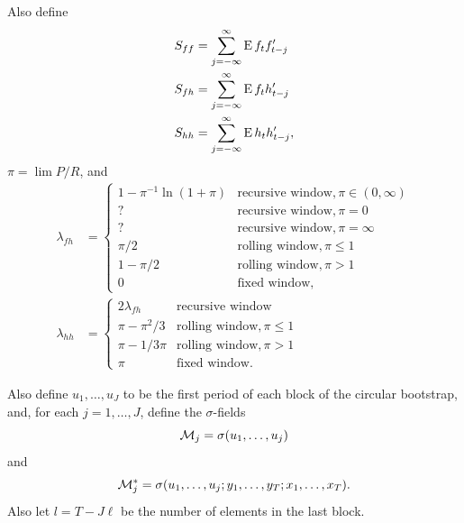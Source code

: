 \documentclass[12pt,fleqn]{article}
\begin{document}
Also define
\begin{align*}
  S_{ff} &= \sum_{j=-\infty}^\infty \operatorname{E} f_t f_{t-j}' \\
  S_{fh} &= \sum_{j=-\infty}^\infty \operatorname{E} f_t h_{t-j}' \\
  S_{hh} &= \sum_{j=-\infty}^\infty \operatorname{E} h_t h_{t-j}',
\end{align*}
$\pi = \lim P/R$, and
\begin{align*}
  \lambda_{fh} &=
  \begin{cases}
    1 - \pi^{-1} \ln(1 + \pi) & \text{recursive window}, \pi \in (0, \infty) \\
    ?                        & \text{recursive window}, \pi = 0 \\
    ?                        & \text{recursive window}, \pi = \infty \\
    \pi / 2 & \text{rolling window}, \pi \leq 1 \\
    1 - \pi / 2 & \text{rolling window}, \pi > 1 \\
    0 & \text{fixed window},
  \end{cases} \\
  \lambda_{hh} &=
  \begin{cases}
    2 \lambda_{fh} & \text{recursive window} \\
    \pi - \pi^2/3 & \text{rolling window}, \pi \leq 1 \\
    \pi - 1/3\pi & \text{rolling window} , \pi > 1 \\
    \pi & \text{fixed window}.
  \end{cases}
\end{align*}

Also define $u_1,\dots,u_J$ to be the first period of each
block of the circular bootstrap, and, for each $j = 1,\dots,J$,
define the $\sigma$-fields
\[
\mathcal{M}_j = \sigma(u_1,\dots,u_j)
\]
and
\[
\mathcal{M}_j^* = \sigma(u_1,\dots,u_j; y_1,\dots,y_T; x_1,\dots,x_T).
\]
Also let $l = T - J \ell$ be the number of elements in the last block.

\newcommand{\WesA}[1][]{\oclt{t}
  (F_t^{#1} - \E^{#1} F_t^{#1}) B^{#1} H_t^{#1}}
\newcommand{\WesB}[1][]{\tfrac{1}{\sqrt{P}} \E^{#1} F_t^{#1} \osum{t} (B_t^{#1} -
  B^{#1}) H_t^{#1}}
\newcommand{\WesC}[1][]{\oclt{t}
  (F_t^{#1} - \E^{#1} F_t^{#1}) (B_t^{#1} - B^{#1}) H_t^{#1}}
\end{document}
